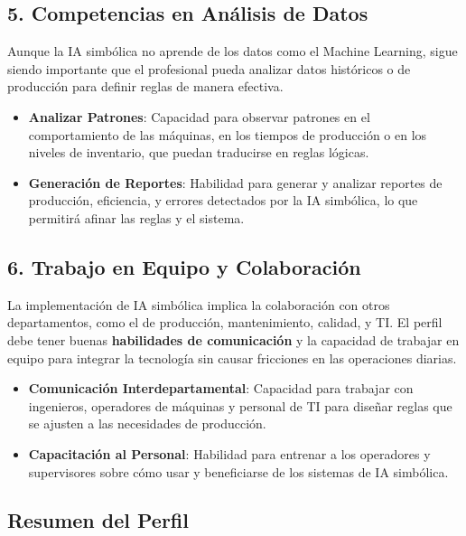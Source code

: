 \documentclass[
  10pt,
  letterpaper,
]{book}
\providecommand{\tightlist}{%
  \setlength{\itemsep}{0pt}\setlength{\parskip}{0pt}}\usepackage{longtable,booktabs,array}
\begin{document}
\subsection{\texorpdfstring{\textbf{5. Competencias en Análisis de
Datos}}{5. Competencias en Análisis de Datos}}\label{competencias-en-anuxe1lisis-de-datos}

Aunque la IA simbólica no aprende de los datos como el Machine Learning,
sigue siendo importante que el profesional pueda analizar datos
históricos o de producción para definir reglas de manera efectiva.

\begin{itemize}
\tightlist
\item
  \textbf{Analizar Patrones}: Capacidad para observar patrones en el
  comportamiento de las máquinas, en los tiempos de producción o en los
  niveles de inventario, que puedan traducirse en reglas lógicas.
\item
  \textbf{Generación de Reportes}: Habilidad para generar y analizar
  reportes de producción, eficiencia, y errores detectados por la IA
  simbólica, lo que permitirá afinar las reglas y el sistema.
\end{itemize}

\subsection{\texorpdfstring{\textbf{6. Trabajo en Equipo y
Colaboración}}{6. Trabajo en Equipo y Colaboración}}\label{trabajo-en-equipo-y-colaboraciuxf3n}

La implementación de IA simbólica implica la colaboración con otros
departamentos, como el de producción, mantenimiento, calidad, y TI. El
perfil debe tener buenas \textbf{habilidades de comunicación} y la
capacidad de trabajar en equipo para integrar la tecnología sin causar
fricciones en las operaciones diarias.

\begin{itemize}
\tightlist
\item
  \textbf{Comunicación Interdepartamental}: Capacidad para trabajar con
  ingenieros, operadores de máquinas y personal de TI para diseñar
  reglas que se ajusten a las necesidades de producción.
\item
  \textbf{Capacitación al Personal}: Habilidad para entrenar a los
  operadores y supervisores sobre cómo usar y beneficiarse de los
  sistemas de IA simbólica.
\end{itemize}

\subsection{\texorpdfstring{\textbf{Resumen del
Perfil}}{Resumen del Perfil}}\label{resumen-del-perfil}
\end{document}

